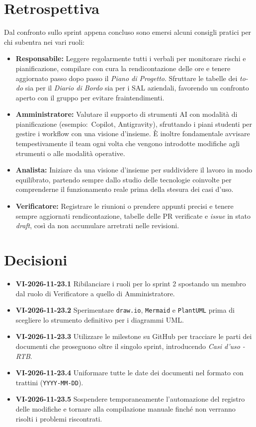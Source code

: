 \documentclass[11pt, a4paper]{article}
\begin{document}
\section{Retrospettiva}
Dal confronto sullo sprint appena concluso sono emersi alcuni consigli pratici per chi subentra nei vari ruoli:
\begin{itemize}
    \item \textbf{Responsabile:} Leggere regolarmente tutti i verbali per monitorare rischi e pianificazione, compilare con cura la rendicontazione delle ore e tenere aggiornato passo dopo passo il \textit{Piano di Progetto}. Sfruttare le tabelle dei \textit{to-do} sia per il \textit{Diario di Bordo} sia per i SAL aziendali, favorendo un confronto aperto con il gruppo per evitare fraintendimenti.
    \item \textbf{Amministratore:} Valutare il supporto di strumenti AI con modalità di pianificazione (esempio:\ Copilot, Antigravity), sfruttando i piani studenti per gestire i workflow con una visione d'insieme. È inoltre fondamentale avvisare tempestivamente il team ogni volta che vengono introdotte modifiche agli strumenti o alle modalità operative.
    \item \textbf{Analista:} Iniziare da una visione d'insieme per suddividere il lavoro in modo equilibrato, partendo sempre dallo studio delle tecnologie coinvolte per comprenderne il funzionamento reale prima della stesura dei casi d'uso.
    \item \textbf{Verificatore:} Registrare le riunioni o prendere appunti precisi e tenere sempre aggiornati rendicontazione, tabelle delle PR verificate e \textit{issue} in stato \textit{draft}, così da non accumulare arretrati nelle revisioni.
\end{itemize}

\section{Decisioni}
\begin{itemize}
    \item \textbf{VI-2026-11-23.1} Ribilanciare i ruoli per lo sprint 2 spostando un membro dal ruolo di Verificatore a quello di Amministratore.
    \item \textbf{VI-2026-11-23.2} Sperimentare \texttt{draw.io}, \texttt{Mermaid} e \texttt{PlantUML} prima di scegliere lo strumento definitivo per i diagrammi UML.
    \item \textbf{VI-2026-11-23.3} Utilizzare le milestone su GitHub per tracciare le parti dei documenti che proseguono oltre il singolo sprint, introducendo \textit{Casi d'uso - RTB}.
    \item \textbf{VI-2026-11-23.4} Uniformare tutte le date dei documenti nel formato con trattini (\texttt{YYYY-MM-DD}).
    \item \textbf{VI-2026-11-23.5} Sospendere temporaneamente l'automazione del registro delle modifiche e tornare alla compilazione manuale finché non verranno risolti i problemi riscontrati.
\end{itemize}
\end{document}
